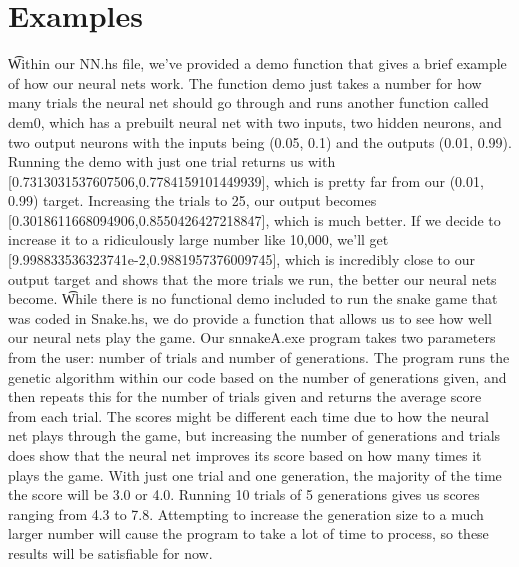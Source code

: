 \documentclass{sigplanconf}
\begin{document}
\section{Examples}
\t Within our NN.hs file, we've provided a demo function that gives a brief example of how our neural nets work. The function demo just takes a number for how many trials the neural net should go through and runs another function called dem0, which has a prebuilt neural net with two inputs, two hidden neurons, and two output neurons with the inputs being (0.05, 0.1) and the outputs (0.01, 0.99). Running the demo with just one trial returns us with [0.7313031537607506,0.7784159101449939], which is pretty far from our (0.01, 0.99) target. Increasing the trials to 25, our output becomes [0.3018611668094906,0.8550426427218847], which is much better. If we decide to increase it to a ridiculously large number like 10,000, we'll get [9.998833536323741e-2,0.9881957376009745], which is incredibly close to our output target and shows that the more trials we run, the better our neural nets become.
\t While there is no functional demo included to run the snake game that was coded in Snake.hs, we do provide a function that allows us to see how well our neural nets play the game. Our snnakeA.exe program takes two parameters from the user: number of trials and number of generations. The program runs the genetic algorithm within our code based on the number of generations given, and then repeats this for the number of trials given and returns the average score from each trial. The scores might be different each time due to how the neural net plays through the game, but increasing the number of generations and trials does show that the neural net improves its score based on how many times it plays the game. With just one trial and one generation, the majority of the time the score will be 3.0 or 4.0. Running 10 trials of 5 generations gives us scores ranging from 4.3 to 7.8. Attempting to increase the generation size to a much larger number will cause the program to take a lot of time to process, so these results will be satisfiable for now.
\end{document}
